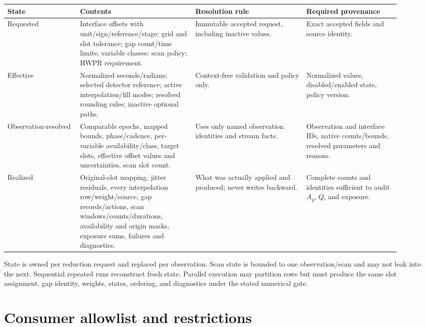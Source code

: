 \documentclass[11pt]{article}
\begin{document}
\begin{longtable}{L{0.17\linewidth}L{0.27\linewidth}L{0.26\linewidth}L{0.22\linewidth}}
\toprule
State & Contents & Resolution rule & Required provenance\\
\midrule
Requested & Interface offsets with unit/sign/reference/stage; grid and slot tolerance; gap count/time limits; variable classes; scan policy; HWPR requirement. & Immutable accepted request, including inactive values. & Exact accepted fields and source identity.\\
Effective & Normalized seconds/radians; selected detector reference; active interpolation/fill modes; resolved rounding rules; inactive optional paths. & Context-free validation and policy only. & Normalized values, disabled/enabled state, policy version.\\
Observation-resolved & Comparable epochs, mapped bounds, phase/cadence, per-variable availability/class, target slots, effective offset values and uncertainties, scan slot count. & Uses only named observation identities and stream facts. & Observation and interface IDs, native counts/bounds, resolved parameters and reasons.\\
Realized & Original-slot mapping, jitter residuals, every interpolation row/weight/source, gap records/actions, scan windows/counts/durations, availability and origin masks, exposure sums, failures and diagnostics. & What was actually applied and produced; never writes backward. & Complete counts and identities sufficient to audit \(A_q\), \(Q\), and exposure.\\
\bottomrule
\end{longtable}

State is owned per reduction request and replaced per observation.  Scan
state is bounded to one observation/scan and may not leak into the next.
Sequential repeated runs reconstruct fresh state.  Parallel execution may
partition rows but must produce the same slot assignment, gap identity,
weights, states, ordering, and diagnostics under the stated numerical gate.

\section{Consumer allowlist and restrictions}
\end{document}
